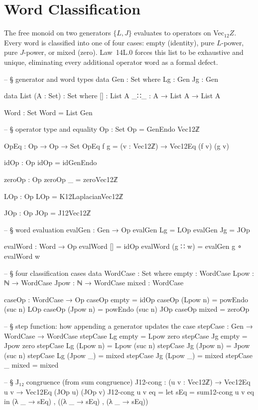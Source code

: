 \documentclass[11pt,a4paper]{book}
\def\mathbb#1{#1}%
\begin{document}
\section{Word Classification}

The free monoid on two generators $\{L, J\}$ evaluates to operators on
Vec$_{12}\mathbb{Z}$.  Every word is classified into one of four cases:
empty (identity), pure $L$-power, pure $J$-power, or mixed (zero).
Law~14L.0 forces this list to be exhaustive and unique, eliminating every
additional operator word as a formal defect.

\begin{code}
-- § generator and word types
data Gen : Set where
  Lg : Gen
  Jg : Gen

data List (A : Set) : Set where
  []  : List A
  _∷_ : A → List A → List A

Word : Set
Word = List Gen

-- § operator type and equality
Op : Set
Op = GenEndo Vec12ℤ

OpEq : Op → Op → Set
OpEq f g = (v : Vec12ℤ) → Vec12Eq (f v) (g v)

idOp : Op
idOp = idGenEndo

zeroOp : Op
zeroOp _ = zeroVec12ℤ

LOp : Op
LOp = K12LaplacianVec12ℤ

JOp : Op
JOp = J12Vec12ℤ

-- § word evaluation
evalGen : Gen → Op
evalGen Lg = LOp
evalGen Jg = JOp

evalWord : Word → Op
evalWord []       = idOp
evalWord (g ∷ w)  = evalGen g ∘ evalWord w

-- § four classification cases
data WordCase : Set where
  empty : WordCase
  Lpow  : ℕ → WordCase
  Jpow  : ℕ → WordCase
  mixed : WordCase

caseOp : WordCase → Op
caseOp empty     = idOp
caseOp (Lpow n)  = powEndo (suc n) LOp
caseOp (Jpow n)  = powEndo (suc n) JOp
caseOp mixed     = zeroOp

-- § step function: how appending a generator updates the case
stepCase : Gen → WordCase → WordCase
stepCase Lg empty     = Lpow zero
stepCase Jg empty     = Jpow zero
stepCase Lg (Lpow n)  = Lpow (suc n)
stepCase Jg (Jpow n)  = Jpow (suc n)
stepCase Lg (Jpow _)  = mixed
stepCase Jg (Lpow _)  = mixed
stepCase _  mixed     = mixed

-- § J₁₂ congruence (from sum congruence)
J12-cong : (u v : Vec12ℤ) → Vec12Eq u v → Vec12Eq (JOp u) (JOp v)
J12-cong u v eq =
  let sEq = sum12-cong u v eq in
  (λ _ → sEq) , ((λ _ → sEq) , (λ _ → sEq))


\end{code}
\end{document}
